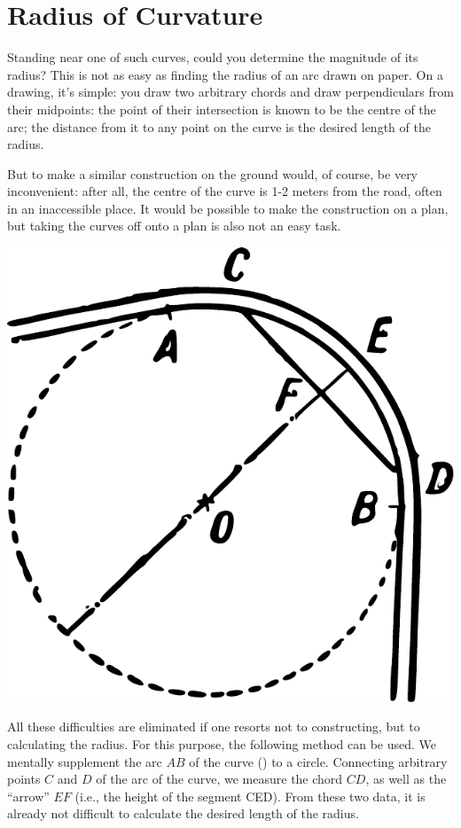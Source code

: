 \section{Radius of Curvature}
\label{sec-4.7}


Standing near one of such curves, could you determine the magnitude of its radius? This is not as easy as finding the radius of an arc drawn on paper. On a drawing, it's simple: you draw two arbitrary chords and draw perpendiculars from their midpoints: the point of their intersection is known to be the centre of the arc; the distance from it to any point on the curve is the desired length of the radius.

But to make a similar construction on the ground would, of course, be very inconvenient: after all, the centre of the curve is 1-2 meters from the road, often in an inaccessible place. It would be possible to make the construction on a plan, but taking the curves off onto a plan is also not an easy task.

\begin{marginfigure}[-4cm]%
\centering
\includegraphics[width=\textwidth]{figures/ch-04/fig-084.pdf}
\end{marginfigure}

All these difficulties are eliminated if one resorts not to constructing, but to calculating the radius. For this purpose, the following method can be used. We mentally supplement the arc $AB$ of the curve () to a circle. Connecting arbitrary points $C$ and $D$ of the arc of the curve, we measure the chord $CD$, as well as the ``arrow'' $EF$ (i.e., the height of the segment CED). From these two data, it is already not difficult to calculate the desired length of the radius.

